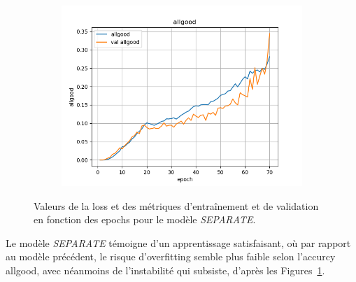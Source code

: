 \documentclass[a4paper]{article}
\begin{document}
\begin{figure}[H]
\begin{subfigure}{0.32\textwidth}
        \includegraphics[width=\linewidth]{../logs/separate/allgood.png}
    \end{subfigure}
    \caption{Valeurs de la loss et des métriques d'entraînement et de validation en fonction des epochs 
            pour le modèle \textit{SEPARATE}.}
    \label{fig: results separate}
\end{figure}

Le modèle \textit{SEPARATE} témoigne d'un apprentissage satisfaisant, où par rapport au modèle précédent, le risque d'overfitting 
semble plus faible selon l'accurcy allgood, avec néanmoins de l'instabilité qui subsiste, d'après les 
Figures~\ref{fig: results separate}.
\end{document}
